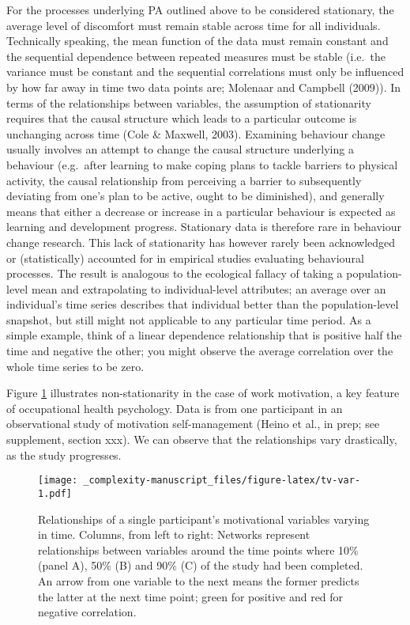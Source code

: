 \documentclass[
  british,
  man,floatsintext]{apa6}
\begin{document}
For the processes underlying PA outlined above to be considered stationary, the average level of discomfort must remain stable across time for all individuals. Technically speaking, the mean function of the data must remain constant and the sequential dependence between repeated measures must be stable (i.e.~the variance must be constant and the sequential correlations must only be influenced by how far away in time two data points are; Molenaar and Campbell (2009)). In terms of the relationships between variables, the assumption of stationarity requires that the causal structure which leads to a particular outcome is unchanging across time (Cole \& Maxwell, 2003). Examining behaviour change usually involves an attempt to change the causal structure underlying a behaviour (e.g.~after learning to make coping plans to tackle barriers to physical activity, the causal relationship from perceiving a barrier to subsequently deviating from one's plan to be active, ought to be diminished), and generally means that either a decrease or increase in a particular behaviour is expected as learning and development progress. Stationary data is therefore rare in behaviour change research. This lack of stationarity has however rarely been acknowledged or (statistically) accounted for in empirical studies evaluating behavioural processes. The result is analogous to the ecological fallacy of taking a population-level mean and extrapolating to individual-level attributes; an average over an individual's time series describes that individual better than the population-level snapshot, but still might not applicable to any particular time period. As a simple example, think of a linear dependence relationship that is positive half the time and negative the other; you might observe the average correlation over the whole time series to be zero.

Figure \ref{fig:tv-var} illustrates non-stationarity in the case of work motivation, a key feature of occupational health psychology. Data is from one participant in an observational study of motivation self-management (Heino et al., in prep; see supplement, section xxx). We can observe that the relationships vary drastically, as the study progresses.

\begin{figure}
\centering
\texttt{[image: \_complexity-manuscript\_files/figure-latex/tv-var-1.pdf]}
\caption{\label{fig:tv-var}Relationships of a single participant's motivational variables varying in time. Columns, from left to right: Networks represent relationships between variables around the time points where 10\% (panel A), 50\% (B) and 90\% (C) of the study had been completed. An arrow from one variable to the next means the former predicts the latter at the next time point; green for positive and red for negative correlation.}
\end{figure}
\end{document}
